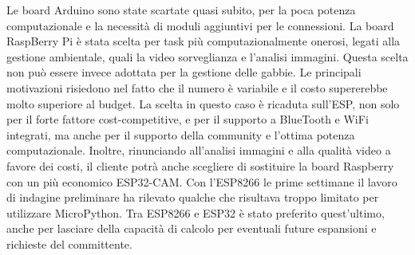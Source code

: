         Le board Arduino sono state scartate quasi subito, per la poca potenza computazionale e la necessità di moduli aggiuntivi per le connessioni. 
        La board RaspBerry Pi è stata scelta per task più computazionalmente onerosi, legati alla gestione ambientale, quali la video sorveglianza e l'analisi immagini. 
        Questa scelta non può essere invece adottata per la gestione delle gabbie. Le principali motivazioni risiedono nel fatto che il numero è variabile e il costo supererebbe molto superiore al budget. 
        La scelta in questo caso è ricaduta sull'ESP, non solo per il forte fattore cost-competitive, e per il supporto a BlueTooth e WiFi integrati, ma anche per il supporto della community e l'ottima potenza computazionale. Inoltre, rinunciando all'analisi immagini e alla qualità video a favore dei costi, il cliente potrà anche scegliere di sostituire la board Raspberry con un più economico ESP32-CAM.
        Con l'ESP8266 le prime settimane il lavoro di indagine preliminare ha rilevato qualche che risultava troppo limitato per utilizzare MicroPython.
        Tra ESP8266 e ESP32 è stato preferito quest'ultimo, anche per lasciare della capacità di calcolo per eventuali future espansioni e richieste del committente. 
